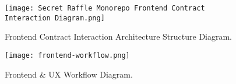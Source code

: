 \documentclass[8pt]{extarticle}
\begin{document}
\begin{figure}[h]
  \vspace{0cm}
  \hspace{-1cm}
  \texttt{[image: Secret Raffle Monorepo Frontend Contract Interaction Diagram.png]}
  \caption{Frontend Contract Interaction Architecture Structure Diagram.}
  \label{fig:Frontend Contract Interaction Architecture Structure Diagram Appendix}
\end{figure}

\begin{figure}[h]
  \vspace{-1.5cm}
  \hspace{1.5cm}
  \texttt{[image: frontend-workflow.png]}
  \caption{Frontend \& UX Workflow Diagram.}
  \label{fig:Frontend Workflow Appendix}
\end{figure}

\newpage
\end{document}
